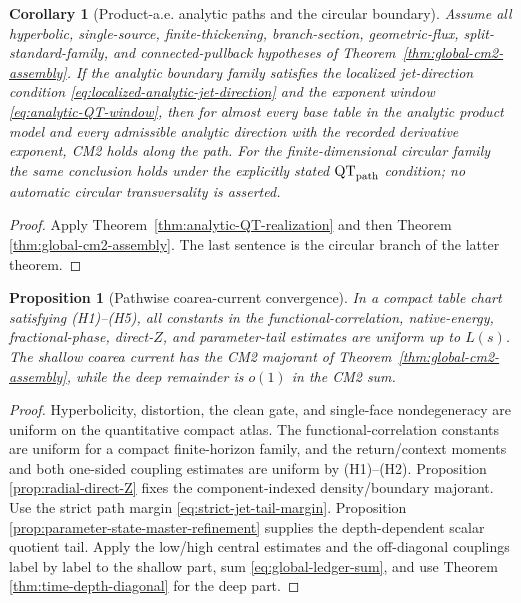 \documentclass[11pt]{article}
\newtheorem{proposition}[theorem]{Proposition}
\newtheorem{corollary}[theorem]{Corollary}
\begin{document}
\begin{corollary}[Product-a.e. analytic paths and the circular boundary]
\label{cor:analytic-pathwise-CM2}
Assume all hyperbolic, single-source, finite-thickening, branch-section,
geometric-flux, split-standard-family, and connected-pullback hypotheses of
Theorem~\ref{thm:global-cm2-assembly}.  If the analytic boundary family
satisfies the localized jet-direction condition
\eqref{eq:localized-analytic-jet-direction} and the exponent window
\eqref{eq:analytic-QT-window}, then for almost every base table in the
analytic product model and every admissible analytic direction with the
recorded derivative exponent, CM2 holds along the path.
For the finite-dimensional circular family the same conclusion holds under
the explicitly stated $\mathrm{QT}_{\rm path}$ condition; no automatic
circular transversality is asserted.
\end{corollary}

\begin{proof}
Apply Theorem~\ref{thm:analytic-QT-realization} and then Theorem
\ref{thm:global-cm2-assembly}.  The last sentence is the circular branch of
the latter theorem.
\end{proof}

\begin{proposition}[Pathwise coarea-current convergence]
\label{prop:common-refinement-majorant}
In a compact table chart satisfying \textup{(H1)--(H5)}, all constants in the
functional-correlation, native-energy, fractional-phase, direct-$Z$, and
parameter-tail estimates are uniform up to $L(s)$.  The shallow coarea current
has the CM2 majorant of Theorem~\ref{thm:global-cm2-assembly}, while the deep
remainder is $o(1)$ in the CM2 sum.
\end{proposition}

\begin{proof}
Hyperbolicity, distortion, the clean gate, and single-face nondegeneracy are
uniform on the quantitative compact atlas.  The
functional-correlation constants are uniform for a compact finite-horizon
family, and the return/context moments and both one-sided coupling estimates
are uniform by \textup{(H1)--(H2)}.  Proposition
\ref{prop:radial-direct-Z} fixes the component-indexed density/boundary
majorant.  Use the strict path margin
\eqref{eq:strict-jet-tail-margin}.  Proposition
\ref{prop:parameter-state-master-refinement} supplies the
depth-dependent scalar quotient tail.  Apply the low/high central estimates
and the off-diagonal couplings label by label to the shallow part, sum
\eqref{eq:global-ledger-sum}, and use Theorem
\ref{thm:time-depth-diagonal} for the deep part.
\end{proof}
\end{document}
